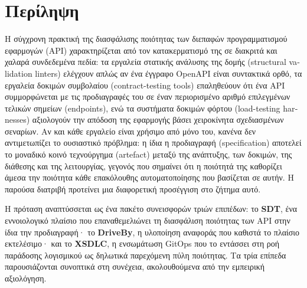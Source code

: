 %
\chapter*{Περίληψη}

\newcommand{\la}[1]{\textlatin{#1}}

Η σύγχρονη πρακτική της διασφάλισης ποιότητας των διεπαφών προγραμματισμού εφαρμογών (\la{API}) χαρακτηρίζεται από τον κατακερματισμό της σε διακριτά και χαλαρά συνδεδεμένα πεδία: τα εργαλεία στατικής ανάλυσης της δομής (\la{structural validation linters}) ελέγχουν απλώς αν ένα έγγραφο \la{OpenAPI} είναι συντακτικά ορθό, τα εργαλεία δοκιμών συμβολαίου (\la{contract-testing tools}) επαληθεύουν ότι ένα \la{API} συμμορφώνεται με τις προδιαγραφές του σε έναν περιορισμένο αριθμό επιλεγμένων τελικών σημείων (\la{endpoints}), ενώ τα συστήματα δοκιμών φόρτου (\la{load-testing harnesses}) αξιολογούν την απόδοση της εφαρμογής βάσει χειροκίνητα σχεδιασμένων σεναρίων. Αν και κάθε εργαλείο είναι χρήσιμο από μόνο του, κανένα δεν αντιμετωπίζει το ουσιαστικό πρόβλημα: η ίδια η προδιαγραφή (\la{specification}) αποτελεί το μοναδικό κοινό τεχνούργημα (\la{artefact}) μεταξύ της ανάπτυξης, των δοκιμών, της διάθεσης και της λειτουργίας, γεγονός που σημαίνει ότι η ποιότητά της καθορίζει άμεσα την ποιότητα κάθε επακόλουθης αυτοματοποίησης που βασίζεται σε αυτήν. Η παρούσα διατριβή προτείνει μια διαφορετική προσέγγιση στο ζήτημα αυτό.

Η πρόταση αναπτύσσεται ως ένα πακέτο συνεισφορών τριών επιπέδων: το \textbf{\la{SDT}}, ένα εννοιολογικό πλαίσιο που επαναθεμελιώνει τη διασφάλιση ποιότητας των \la{API} στην ίδια την προδιαγραφή· το \textbf{\la{DriveBy}}, η υλοποίηση αναφοράς που καθιστά το πλαίσιο εκτελέσιμο· και το \textbf{\la{XSDLC}}, η ενσωμάτωση \la{GitOps} που το εντάσσει στη ροή παράδοσης λογισμικού ως δηλωτικά παρεχόμενη πύλη ποιότητας. Τα τρία επίπεδα παρουσιάζονται συνοπτικά στη συνέχεια, ακολουθούμενα από την εμπειρική αξιολόγηση.

